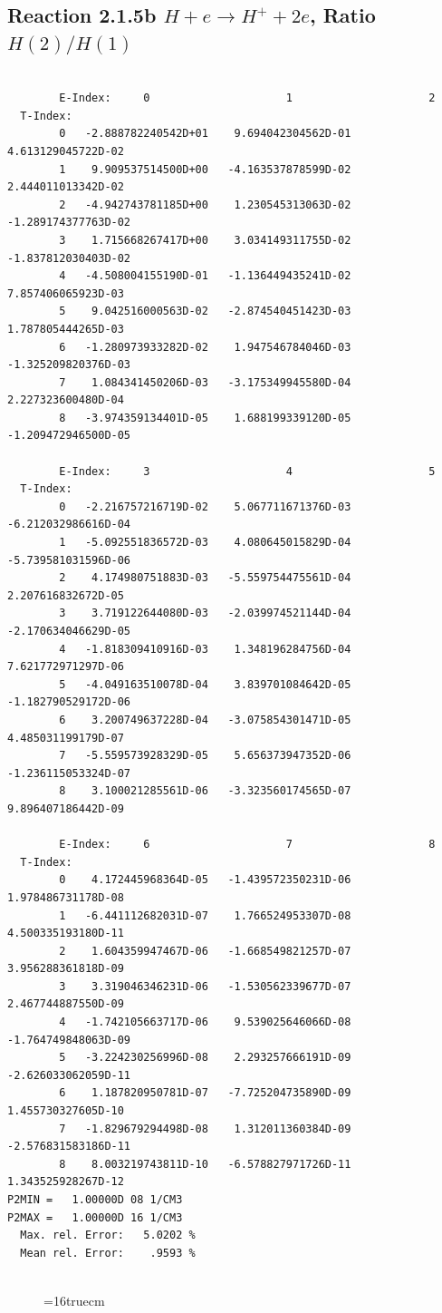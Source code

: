 \documentclass[12pt,dvipdfmx]{article}
\begin{document}
\newpage
\subsection{
Reaction 2.1.5b  $H + e \rightarrow H^+ + 2e$, Ratio $H(2)/H(1)$
}


\begin{small}\begin{verbatim}

        E-Index:     0                     1                     2
  T-Index:
        0   -2.888782240542D+01    9.694042304562D-01    4.613129045722D-02
        1    9.909537514500D+00   -4.163537878599D-02    2.444011013342D-02
        2   -4.942743781185D+00    1.230545313063D-02   -1.289174377763D-02
        3    1.715668267417D+00    3.034149311755D-02   -1.837812030403D-02
        4   -4.508004155190D-01   -1.136449435241D-02    7.857406065923D-03
        5    9.042516000563D-02   -2.874540451423D-03    1.787805444265D-03
        6   -1.280973933282D-02    1.947546784046D-03   -1.325209820376D-03
        7    1.084341450206D-03   -3.175349945580D-04    2.227323600480D-04
        8   -3.974359134401D-05    1.688199339120D-05   -1.209472946500D-05

        E-Index:     3                     4                     5
  T-Index:
        0   -2.216757216719D-02    5.067711671376D-03   -6.212032986616D-04
        1   -5.092551836572D-03    4.080645015829D-04   -5.739581031596D-06
        2    4.174980751883D-03   -5.559754475561D-04    2.207616832672D-05
        3    3.719122644080D-03   -2.039974521144D-04   -2.170634046629D-05
        4   -1.818309410916D-03    1.348196284756D-04    7.621772971297D-06
        5   -4.049163510078D-04    3.839701084642D-05   -1.182790529172D-06
        6    3.200749637228D-04   -3.075854301471D-05    4.485031199179D-07
        7   -5.559573928329D-05    5.656373947352D-06   -1.236115053324D-07
        8    3.100021285561D-06   -3.323560174565D-07    9.896407186442D-09

        E-Index:     6                     7                     8
  T-Index:
        0    4.172445968364D-05   -1.439572350231D-06    1.978486731178D-08
        1   -6.441112682031D-07    1.766524953307D-08    4.500335193180D-11
        2    1.604359947467D-06   -1.668549821257D-07    3.956288361818D-09
        3    3.319046346231D-06   -1.530562339677D-07    2.467744887550D-09
        4   -1.742105663717D-06    9.539025646066D-08   -1.764749848063D-09
        5   -3.224230256996D-08    2.293257666191D-09   -2.626033062059D-11
        6    1.187820950781D-07   -7.725204735890D-09    1.455730327605D-10
        7   -1.829679294498D-08    1.312011360384D-09   -2.576831583186D-11
        8    8.003219743811D-10   -6.578827971726D-11    1.343525928267D-12
P2MIN =   1.00000D 08 1/CM3
P2MAX =   1.00000D 16 1/CM3
  Max. rel. Error:   5.0202 %
  Mean rel. Error:    .9593 %


\end{verbatim}\end{small}
\begin{figure} \label{2.1.5b}
\epsfxsize=16truecm
\end{figure}
\end{document}
